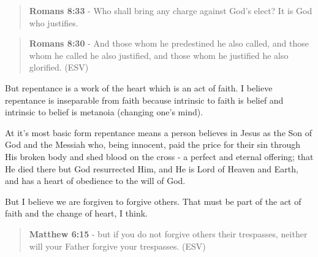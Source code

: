 \documentclass[11pt]{article}
\begin{document}
\begin{quote}
\textbf{Romans 8:33} - Who shall bring any charge against God's elect? It is God who justifies.
\end{quote}

\begin{quote}
\textbf{Romans 8:30} - And those whom he predestined he also called, and those whom he called he also justified, and those whom he justified he also glorified. (ESV)
\end{quote}

But repentance is a work of the heart which is an act of faith.
I believe repentance is inseparable from faith because intrinsic to faith is belief and intrinsic to belief is metanoia (changing one's mind).

At it's most basic form repentance means a
person believes in Jesus as the Son of God and
the Messiah who, being innocent, paid the
price for their sin through His broken body
and shed blood on the cross - a perfect and
eternal offering; that He died there but God
resurrected Him, and He is Lord of Heaven and
Earth, and has a heart of obedience to the will of God.

But I believe we are forgiven to forgive others. That must be part of the act of faith and the change of heart, I think.

\begin{quote}
\textbf{Matthew 6:15} - but if you do not forgive others their trespasses, neither will your Father forgive your trespasses. (ESV)
\end{quote}
\end{document}

